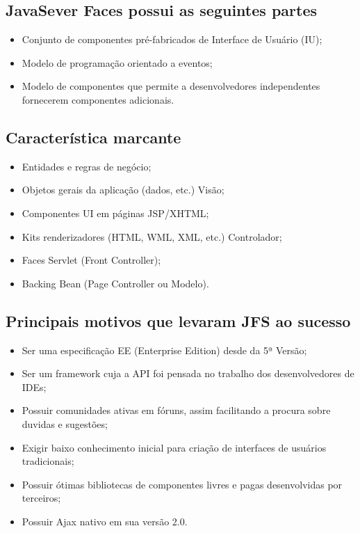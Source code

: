 \documentclass[12pt,a4paper]{article}
\begin{document}
\subsection{JavaSever Faces possui as seguintes partes}
\begin{itemize}
\item Conjunto de componentes pré-fabricados de Interface de Usuário (IU);

\item Modelo de programação orientado a eventos;

\item Modelo de componentes que permite a desenvolvedores independentes fornecerem componentes adicionais.
\end{itemize}

\subsection{Característica marcante}
\begin{itemize}
\item Entidades e regras de negócio;

\item Objetos gerais da aplicação (dados, etc.)
Visão;

\item Componentes UI em páginas JSP/XHTML;

\item Kits renderizadores (HTML, WML, XML, etc.)
Controlador;

\item Faces Servlet (Front Controller);

\item Backing Bean (Page Controller ou Modelo).
\end{itemize}

\subsection{Principais motivos que levaram JFS ao sucesso}
\begin{itemize}
\item Ser uma especificação EE (Enterprise Edition)  desde da 5ª Versão;

\item Ser um framework cuja a API foi pensada no trabalho dos desenvolvedores de IDEs;

\item Possuir comunidades ativas em fóruns, assim facilitando a procura sobre duvidas e sugestões;

\item Exigir baixo conhecimento inicial para criação de interfaces de usuários tradicionais;

\item Possuir ótimas bibliotecas de componentes livres e pagas desenvolvidas por terceiros;

\item Possuir Ajax nativo em sua versão 2.0.
\end{itemize}
\end{document}
